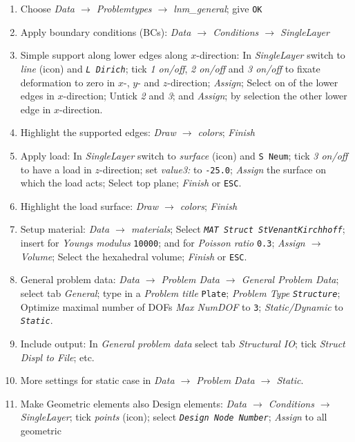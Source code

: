 \begin{enumerate}
\item Choose \emph{Data $\rightarrow$ Problemtypes $\rightarrow$ lnm\_general};
give \texttt{OK}
\item Apply boundary conditions (BCs): \emph{Data $\rightarrow$ Conditions
$\rightarrow$ SingleLayer}
\item Simple support along lower edges along $x$-direction: In \emph{SingleLayer}
switch to \emph{line} (icon) and \texttt{\emph{L Dirich}}; tick \emph{1
on/off}, \emph{2 on/off} and \emph{3 on/off} to fixate deformation
to zero in $x$-, $y$- and $z$-direction; \emph{Assign}; Select
on of the lower edges in $x$-direction; Untick \emph{2} and \emph{3};
and \emph{Assign}; by selection the other lower edge in $x$-direction. 
\item Highlight the supported edges: \emph{Draw $\rightarrow$ colors};
\emph{Finish}
\item Apply load: In \emph{SingleLayer} switch to \emph{surface} (icon)
and \texttt{S Neum}; tick \emph{3 on/off} to have a load in $z$-direction;
set \emph{value3:} to \texttt{-25.0}; \emph{Assign} the surface on
which the load acts; Select top plane; \emph{Finish} or \texttt{ESC}. 
\item Highlight the load surface: \emph{Draw $\rightarrow$ colors}; \emph{Finish}
\item Setup material: \emph{Data $\rightarrow$ materials}; Select \texttt{\emph{MAT
Struct StVenantKirchhoff}}; insert for \emph{Youngs modulus} \texttt{10000};
and for \emph{Poisson ratio} \texttt{0.3}; \emph{Assign $\rightarrow$
Volume}; Select the hexahedral volume; \emph{Finish} or \texttt{ESC}. 
\item General problem data: \emph{Data $\rightarrow$ Problem Data $\rightarrow$
General Problem Data}; select tab \emph{General}; type in a \emph{Problem
title} \texttt{Plate}; \emph{Problem Type} \texttt{\emph{Structure}};
Optimize maximal number of DOFs \emph{Max NumDOF} to \texttt{3}; \emph{Static/Dynamic}
to \texttt{\emph{Static}}. 
\item Include output: In \emph{General problem data} select tab \emph{Structural
IO}; tick \emph{Struct Displ to File}; etc. 
\item More settings for static case in \emph{Data $\rightarrow$ Problem
Data $\rightarrow$ Static}. 
\item Make Geometric elements also Design elements: \emph{Data $\rightarrow$
Conditions $\rightarrow$ SingleLayer}; tick \emph{points} (icon);
select \texttt{\emph{Design Node Number}}; \emph{Assign} to all geometric

\end{enumerate}
